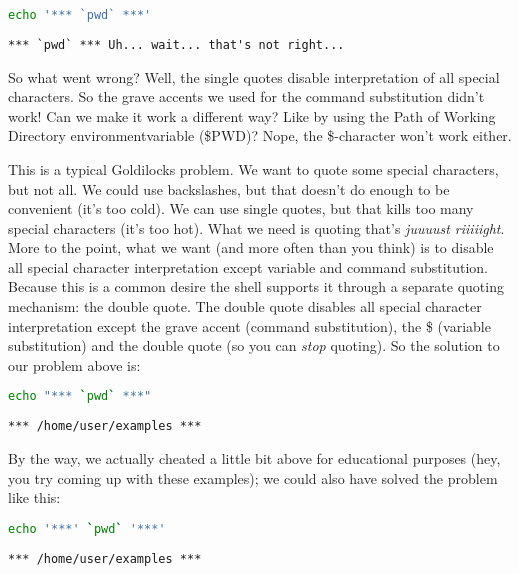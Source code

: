 \lstset{basicstyle=\scriptsize, numbers=left, captionpos=b, tabsize=4}
\begin{lstlisting}[caption=Printing the working directory with decorations,language={bash},
breaklines=true,xleftmargin=15pt,label=lst:Printing the working directory with decorations]
echo '*** `pwd` ***'
\end{lstlisting}

\scriptsize
\begin{verbatim}
*** `pwd` *** Uh... wait... that's not right...
\end{verbatim}
\normalsize

So what went wrong? Well, the single quotes disable interpretation of all
special characters. So the grave accents we used for the command substitution
didn't work! Can we make it work a different way? Like by using the Path of
Working Directory environmentvariable (\$PWD)? Nope, the \$-character won't
work either.

This is a typical Goldilocks problem. We want to quote some special characters,
but not all. We could use backslashes, but that doesn't do enough to be
convenient (it's too cold). We can use single quotes, but that kills too many
special characters (it's too hot). What we need is quoting that's \emph{juuuust
riiiiight}. More to the point, what we want (and more often than you think) is
to disable all special character interpretation except variable and command
substitution. Because this is a common desire the shell supports it through a
separate quoting mechanism: the double quote. The double quote disables all
special character interpretation except the grave accent (command
substitution), the \$ (variable substitution) and the double quote (so you can
\emph{stop} quoting). So the solution to our problem above is:

\lstset{basicstyle=\scriptsize, numbers=left, captionpos=b, tabsize=4}
\begin{lstlisting}[caption=Printing the working directory with decorations take II,language={bash},
breaklines=true,xleftmargin=15pt,label=lst:Printing the working directory with decorations take II]
echo "*** `pwd` ***"
\end{lstlisting}

\scriptsize
\begin{verbatim}
*** /home/user/examples ***
\end{verbatim}
\normalsize

By the way, we actually cheated a little bit above for educational purposes
(hey, you try coming up with these examples); we could also have solved the
problem like this:

\lstset{basicstyle=\scriptsize, numbers=left, captionpos=b, tabsize=4}
\begin{lstlisting}[caption=Printing the working directory with decorations alternative,language={bash},
breaklines=true,xleftmargin=15pt,label=lst:Printing the working directory with decorations alternative]
echo '***' `pwd` '***'
\end{lstlisting}

\scriptsize
\begin{verbatim}
*** /home/user/examples ***
\end{verbatim}
\normalsize
